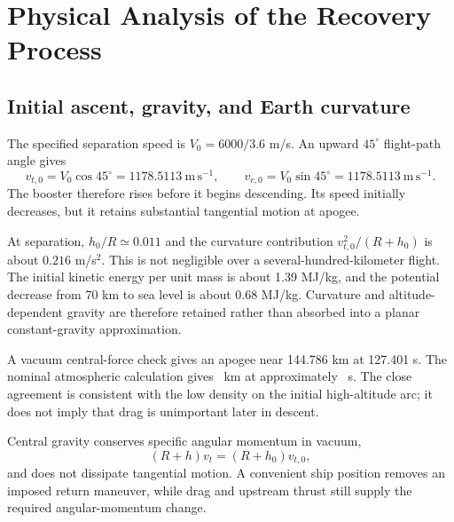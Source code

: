 \documentclass[11pt,a4paper]{article}
\newcommand{\ms}{\mathrm{m\,s^{-1}}}
\begin{document}
\section{Physical Analysis of the Recovery Process}
\label{sec:physical}
\subsection{Initial ascent, gravity, and Earth curvature}
The specified separation speed is $V_0=6000/3.6$ m/s. An upward $45^\circ$ flight-path angle gives
\begin{equation}
 v_{t,0}=V_0\cos45^\circ=1178.5113\ \ms,\qquad
 v_{r,0}=V_0\sin45^\circ=1178.5113\ \ms.
\label{eq:initial}
\end{equation}
The booster therefore rises before it begins descending. Its speed initially decreases, but it retains substantial tangential motion at apogee.

At separation, $h_0/R\simeq0.011$ and the curvature contribution $v_{t,0}^2/(R+h_0)$ is about $0.216$ m/s$^2$. This is not negligible over a several-hundred-kilometer flight. The initial kinetic energy per unit mass is about 1.39 MJ/kg, and the potential decrease from 70 km to sea level is about 0.68 MJ/kg. Curvature and altitude-dependent gravity are therefore retained rather than absorbed into a planar constant-gravity approximation.

A vacuum central-force check gives an apogee near 144.786 km at 127.401 s. The nominal atmospheric calculation gives \Apogee\ km at approximately \ApogeeTime\ s. The close agreement is consistent with the low density on the initial high-altitude arc; it does not imply that drag is unimportant later in descent.

Central gravity conserves specific angular momentum in vacuum,
\begin{equation}
 (R+h)v_t=(R+h_0)v_{t,0},
\label{eq:angularmomentum}
\end{equation}
and does not dissipate tangential motion. A convenient ship position removes an imposed return maneuver, while drag and upstream thrust still supply the required angular-momentum change.
\end{document}
